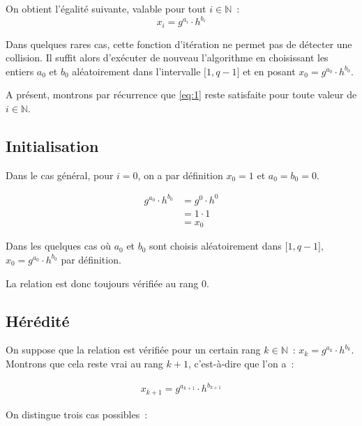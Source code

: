        On obtient l'égalité suivante, valable pour tout $i \in \mathbb{N}$~:
        \begin{equation} \label{eq:1}
          x_i = g^{a_i} \cdot h^{b_i}
        \end{equation}

		Dans quelques rares cas, cette fonction d'itération ne permet pas de détecter une collision. Il suffit alors d'exécuter de nouveau l'algorithme en choisissant les entiers $a_0$ et $b_0$ aléatoirement dans l'intervalle $\mathopen{[}1,q-1\mathclose{]}$ et en posant $x_0 = g^{a_0} \cdot h^{b_0}$.

		A présent, montrons par récurrence que \eqref{eq:1} reste satisfaite pour toute valeur de $i \in \mathbb{N}$.

        \subsection*{Initialisation}

        Dans le cas général, pour $i = 0$, on a par définition $x_0 = 1$ et $a_0 = b_0 = 0$.

        \begin{align*}
          g^{a_0} \cdot h^{b_0} &= g^{0} \cdot h^{0} \\
                                &= 1 \cdot 1 \\
                                &= x_0
        \end{align*}

        Dans les quelques cas où $a_0$ et $b_0$ sont choisis aléatoirement dans $\mathopen{[}1,q-1\mathclose{]}$, $x_0 = g^{a_0} \cdot h^{b_0}$ par définition.

        La relation est donc toujours vérifiée au rang $0$.

        \subsection*{Hérédité}

        On suppose que la relation est vérifiée pour un certain rang $k \in \mathbb{N}$~: $x_k = g^{a_k} \cdot h^{b_k}$. Montrons que cela reste vrai au rang $k + 1$, c'est-à-dire que l'on a~:

        \begin{align*}
          x_{k+1} = g^{a_{k+1}} \cdot h^{b_{k+1}}
        \end{align*}

        On distingue trois cas possibles~:

